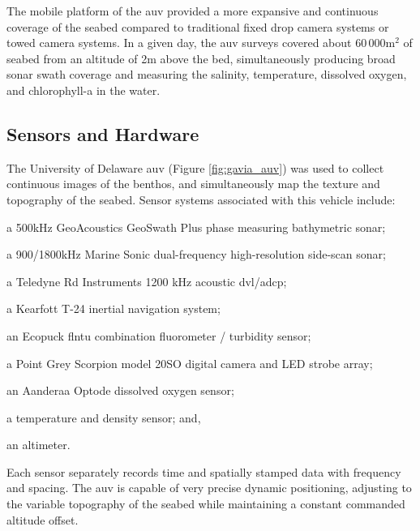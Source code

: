 \documentclass {udthesis}
\begin{document}
The mobile platform of the \gls{auv} provided a more expansive and continuous coverage 
of the seabed compared to traditional fixed drop camera systems or towed camera systems. 
In a given day, the \gls{auv} surveys covered about $60\,000$\;m$^2$ of seabed 
from an altitude of 2\;m above the bed, simultaneously producing broad sonar 
swath coverage and measuring the salinity, temperature, dissolved oxygen, and 
chlorophyll-a  in the water.


\subsection{Sensors and Hardware}
\label{section:equipment}

The University of Delaware \gls{auv} (Figure \ref{fig:gavia_auv}) was used to collect 
continuous images of the benthos, and simultaneously map the texture and topography of 
the seabed. Sensor systems associated with this vehicle include: \begin{enumerate*}[label=(\arabic*):, start=1] 
\item a 500\;kHz GeoAcoustics GeoSwath Plus phase measuring bathymetric 
sonar; \item a 900/1800\;kHz Marine Sonic dual-frequency high-resolution 
side-scan sonar; 
\item a Teledyne Rd Instruments 1200 kHz acoustic \gls{dvl}/\gls{adcp}; 
\item a Kearfott T-24 inertial navigation system; 
\item an Ecopuck flntu combination fluorometer / turbidity sensor; 
\item a Point Grey Scorpion model 20SO digital camera and LED strobe array; 
\item an Aanderaa Optode dissolved oxygen sensor; 
\item a temperature and density sensor; and, \item an altimeter. \end{enumerate*} 
Each sensor separately records time and spatially stamped data with frequency and spacing.
The \gls{auv} is capable of very precise dynamic positioning, adjusting to the variable 
topography of the seabed while maintaining a constant commanded altitude offset.
\end{document}
